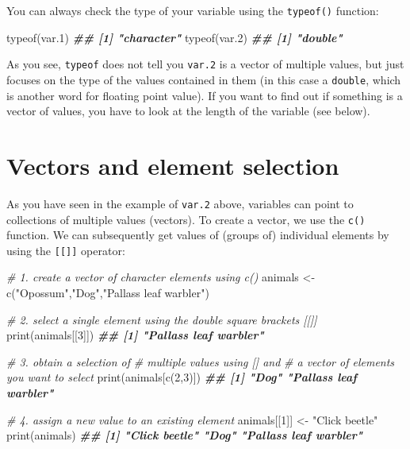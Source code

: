 \documentclass[
]{book}
\newenvironment{Shaded}{\begin{snugshade}}{\end{snugshade}}
\newcommand{\CommentTok}[1]{\textcolor[rgb]{0.56,0.35,0.01}{\textit{#1}}}
\newcommand{\DecValTok}[1]{\textcolor[rgb]{0.00,0.00,0.81}{#1}}
\newcommand{\DocumentationTok}[1]{\textcolor[rgb]{0.56,0.35,0.01}{\textbf{\textit{#1}}}}
\newcommand{\FloatTok}[1]{\textcolor[rgb]{0.00,0.00,0.81}{#1}}
\newcommand{\FunctionTok}[1]{\textcolor[rgb]{0.00,0.00,0.00}{#1}}
\newcommand{\NormalTok}[1]{#1}
\newcommand{\OtherTok}[1]{\textcolor[rgb]{0.56,0.35,0.01}{#1}}
\newcommand{\StringTok}[1]{\textcolor[rgb]{0.31,0.60,0.02}{#1}}
\begin{document}
You can always check the type of your variable using the \texttt{typeof()} function:

\begin{Shaded}
\begin{Highlighting}[]
\FunctionTok{typeof}\NormalTok{(var}\FloatTok{.1}\NormalTok{)}
\DocumentationTok{\#\# [1] "character"}
\FunctionTok{typeof}\NormalTok{(var}\FloatTok{.2}\NormalTok{)}
\DocumentationTok{\#\# [1] "double"}
\end{Highlighting}
\end{Shaded}

As you see, \texttt{typeof} does not tell you \texttt{var.2} is a vector of multiple values, but just focuses on the type of the values contained in them (in this case a \texttt{double}, which is another word for floating point value). If you want to find out if something is a vector of values, you have to look at the length of the variable (see below).

\hypertarget{vectors-and-element-selection}{%
\section{Vectors and element selection}\label{vectors-and-element-selection}}

As you have seen in the example of \texttt{var.2} above, variables can point to collections of multiple values (vectors). To create a vector, we use the \texttt{c()} function. We can subsequently get values of (groups of) individual elements by using the \texttt{{[}{[}{]}{]}} operator:

\begin{Shaded}
\begin{Highlighting}[]
\CommentTok{\# 1. create a vector of character elements using c()}
\NormalTok{animals }\OtherTok{\textless{}{-}} \FunctionTok{c}\NormalTok{(}\StringTok{"Opossum"}\NormalTok{,}\StringTok{"Dog"}\NormalTok{,}\StringTok{"Pallas\textquotesingle{}s leaf warbler"}\NormalTok{)}

\CommentTok{\# 2. select a single element using the double square brackets [[]]}
\FunctionTok{print}\NormalTok{(animals[[}\DecValTok{3}\NormalTok{]])}
\DocumentationTok{\#\# [1] "Pallas\textquotesingle{}s leaf warbler"}


\CommentTok{\# 3. obtain a selection of }
\CommentTok{\# multiple values using [] and}
\CommentTok{\# a vector of elements you want to select}
\FunctionTok{print}\NormalTok{(animals[}\FunctionTok{c}\NormalTok{(}\DecValTok{2}\NormalTok{,}\DecValTok{3}\NormalTok{)])}
\DocumentationTok{\#\# [1] "Dog"                   "Pallas\textquotesingle{}s leaf warbler"}


\CommentTok{\# 4. assign a new value to an existing element}
\NormalTok{animals[[}\DecValTok{1}\NormalTok{]] }\OtherTok{\textless{}{-}} \StringTok{"Click beetle"}
\FunctionTok{print}\NormalTok{(animals)}
\DocumentationTok{\#\# [1] "Click beetle"          "Dog"                   "Pallas\textquotesingle{}s leaf warbler"}
\end{Highlighting}
\end{Shaded}
\end{document}
